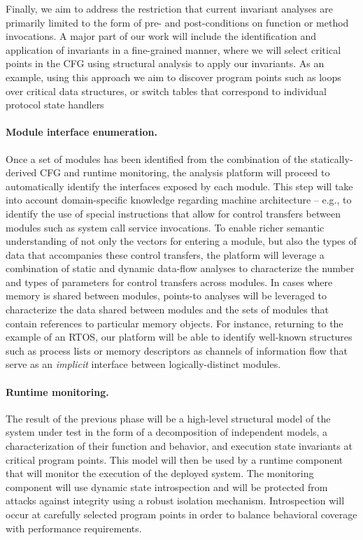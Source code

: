 \documentclass[letterpaper,twoside,11pt,headings=small]{scrartcl}
\begin{document}
Finally, we aim to address the restriction that current invariant analyses are
primarily limited to the form of pre- and post-conditions on function or
method invocations.  A major part of our work will include the identification
and application of invariants in a fine-grained manner, where we will select
critical points in the CFG using structural analysis to apply our invariants.
As an example, using this approach we aim to discover program points such as
loops over critical data structures, or switch tables that correspond to
individual protocol state handlers

\paragraph{Module interface enumeration.} Once a set of modules has been
identified from the combination of the statically-derived CFG and runtime
monitoring, the analysis platform will proceed to automatically identify the
interfaces exposed by each module.  This step will take into account
domain-specific knowledge regarding machine architecture -- e.g., to identify
the use of special instructions that allow for control transfers between
modules such as system call service invocations.  To enable richer semantic
understanding of not only the vectors for entering a module, but also the
types of data that accompanies these control transfers, the platform will
leverage a combination of static and dynamic data-flow analyses to
characterize the number and types of parameters for control transfers across
modules.  In cases where memory is shared between modules, points-to analyses
will be leveraged to characterize the data shared between modules and the sets
of modules that contain references to particular memory objects.  For
instance, returning to the example of an RTOS, our platform will be able to
identify well-known structures such as process lists or memory descriptors as
channels of information flow that serve as an \emph{implicit} interface
between logically-distinct modules.

\paragraph{Runtime monitoring.} The result of the previous phase will be a
high-level structural model of the system under test in the form of a
decomposition of independent models, a characterization of their function and
behavior, and execution state invariants at critical program points.  This
model will then be used by a runtime component that will monitor the execution
of the deployed system. The monitoring component will use dynamic state
introspection and will be protected from attacks against integrity using a
robust isolation mechanism. Introspection will occur at carefully selected
program points in order to balance behavioral coverage with performance
requirements.
\end{document}
